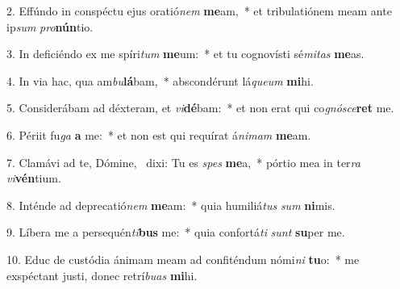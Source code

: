 2. Effúndo in conspéctu ejus oratió\textit{nem} \textbf{me}am,~*  et tribulatiónem meam ante ip\textit{sum} \textit{pro}\textbf{nún}tio.\

3. In deficiéndo ex me spíri\textit{tum} \textbf{me}um:~*  et tu cognovísti sé\textit{mi}\textit{tas} \textbf{me}as.\

4. In via hac, qua am\textit{bu}\textbf{lá}bam,~*  abscondérunt lá\textit{que}\textit{um} \textbf{mi}hi.\

5. Considerábam ad déxteram, et \textit{vi}\textbf{dé}bam:~*  et non erat qui co\textit{gnó}\textit{sce}\textbf{ret} me.\

6. Périit fu\textit{ga} \textbf{a} me:~*  et non est qui requírat á\textit{ni}\textit{mam} \textbf{me}am.\

7. Clamávi ad te, Dómine, \dag\  dixi: Tu es \textit{spes} \textbf{me}a,~*  pórtio mea in ter\textit{ra} \textit{vi}\textbf{vén}tium.\

8. Inténde ad deprecatió\textit{nem} \textbf{me}am:~*  quia humiliá\textit{tus} \textit{sum} \textbf{ni}mis.\

9. Líbera me a persequén\textit{ti}\textbf{bus} me:~*  quia confortá\textit{ti} \textit{sunt} \textbf{su}per me.\

10. Educ de custódia ánimam meam ad confiténdum nómi\textit{ni} \textbf{tu}o:~*  me exspéctant justi, donec retrí\textit{bu}\textit{as} \textbf{mi}hi.\

